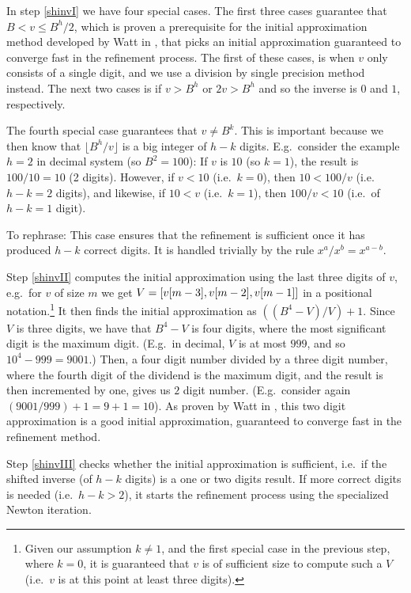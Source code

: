 In step \ref{shinvI} we have four special cases. The first three cases
guarantee that $B < v \leq B^h/2$, which is proven a prerequisite for the initial
approximation method developed by Watt in \cite{watt2023efficient}, that picks
an initial approximation guaranteed to converge fast in the refinement process.
The first of these cases, is when $v$ only consists of a single digit, and we
use a division by single precision method instead. The next two cases is if
$v > B^h$ or $2v > B^h$ and so the inverse is $0$ and $1$, respectively.

The fourth special case guarantees that $v \neq B^k$. This is important because we
then know that $\lfloor B^{h}/ v \rfloor$ is a big integer of $h-k$ digits. E.g.\ consider
the example $h=2$ in decimal system (so $B^2=100$): If $v$ is $10$ (so $k = 1$),
the result is $100/10 = 10$ (2 digits). However, if $v < 10$ (i.e.\ $k=0$), then
$10 < 100/v$ (i.e.\ $h-k=2$ digits), and likewise, if $10 < v$ (i.e.\ $k=1$),
then $100/v < 10$ (i.e.\ of $h-k=1$ digit).

To rephrase: This case ensures that the refinement is sufficient once it has
produced $h-k$ correct digits. It is handled trivially by the rule
$x^a/x^b=x^{a-b}$.

Step \ref{shinvII} computes the initial approximation using the last three
digits of $v$, e.g.\ for $v$ of size $m$ we get $V= \mathtt{[}v[m-3],v[m-2],v[m-1]\mathtt{]}$
in a positional notation.\footnote{Given our assumption $k \neq 1$, and the first
  special case in the previous step, where $k = 0$, it is guaranteed that $v$ is
  of sufficient size to compute such a $V$ (i.e.\ $v$ is at this point at least
  three digits).} It then finds the initial approximation as
$((B^4-V)/V)+1$. Since $V$ is three digits, we have that $B^4-V$ is four digits,
where the most significant digit is the maximum digit. (E.g.\ in decimal, $V$ is
at most $999$, and so $10^4-999 = 9001$.) Then, a four digit number divided by a
three digit number, where the fourth digit of the dividend is the maximum digit,
and the result is then incremented by one, gives us $2$ digit number. (E.g.\
consider again $(9001/999)+1=9+1=10$). As proven by Watt in
\cite{watt2023efficient}, this two digit approximation is a good initial
approximation, guaranteed to converge fast in the refinement method.

Step \ref{shinvIII} checks whether the initial approximation is sufficient,
i.e.\ if the shifted inverse (of $h-k$ digits) is a one or two digits result. If
more correct digits is needed (i.e.\ $h-k > 2$), it starts the refinement process
using the specialized Newton iteration.

